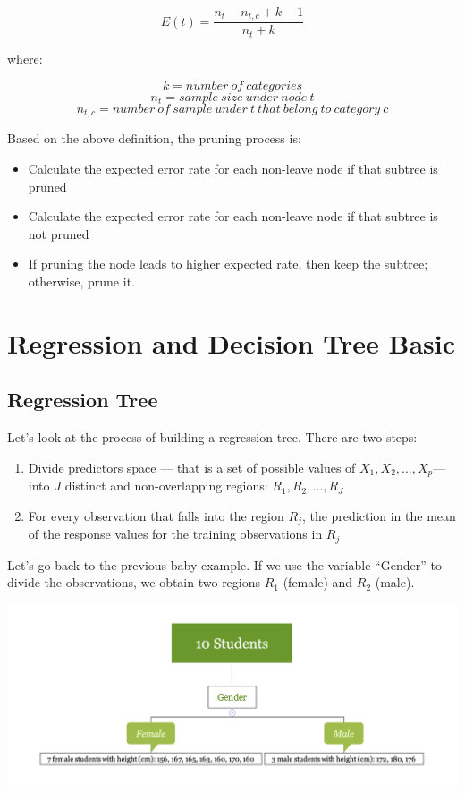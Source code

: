 \documentclass[12pt,]{krantz}
\providecommand{\tightlist}{%
  \setlength{\itemsep}{0pt}\setlength{\parskip}{0pt}}
\begin{document}
\[E(t)=\frac{n_{t}-n_{t,c}+k-1}{n_{t}+k}\]

where:

\[k=number\ of\ categories\]
\[n_{t}=sample\ size\ under\ node\ t\]
\[n_{t,c}= number\ of\ sample\ under\ t\ that\ belong\ to\ category\ c\]

Based on the above definition, the pruning process is\citep{Espoito1997}:

\begin{itemize}
\tightlist
\item
  Calculate the expected error rate for each non-leave node if that subtree is pruned
\item
  Calculate the expected error rate for each non-leave node if that subtree is not pruned
\item
  If pruning the node leads to higher expected rate, then keep the subtree; otherwise, prune it.
\end{itemize}

\hypertarget{regression-and-decision-tree-basic}{%
\section{Regression and Decision Tree Basic}\label{regression-and-decision-tree-basic}}

\hypertarget{regression-tree}{%
\subsection{Regression Tree}\label{regression-tree}}

Let's look at the process of building a regression tree\citep{ISLR15}. There are two steps:

\begin{enumerate}
\def\labelenumi{\arabic{enumi}.}
\tightlist
\item
  Divide predictors space --- that is a set of possible values of \(X_1,X_2,\dots,X_p\)--- into \(J\) distinct and non-overlapping regions: \(R_1,R_2,\dots,R_J\)
\item
  For every observation that falls into the region \(R_j\), the prediction in the mean of the response values for the training observations in \(R_j\)
\end{enumerate}

Let's go back to the previous baby example. If we use the variable ``Gender'' to divide the observations, we obtain two regions \(R_1\) (female) and \(R_2\) (male).

\includegraphics{images/varEN.png}
\end{document}

